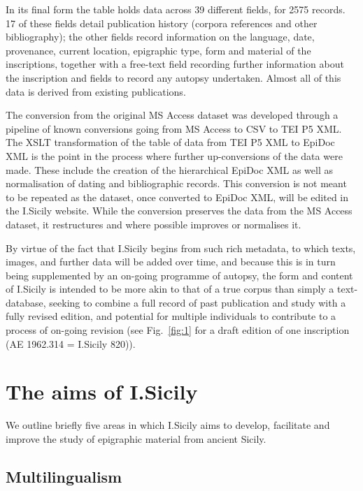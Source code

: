 \documentclass[amsthm,ebook]{saparticle}
\begin{document}
In its final form the table holds data across 39 different fields, for 2575 records. 17 of these fields detail
publication history (corpora references and other bibliography); the other fields record information on the language,
date, provenance, current location, epigraphic type, form and material of the inscriptions, together with a free-text
field recording further information about the inscription and fields to record any autopsy undertaken. Almost all of
this data is derived from existing publications.

The conversion from the original MS Access dataset was developed through a pipeline of known conversions going from MS
Access to CSV to TEI P5 XML. The XSLT transformation of the table of data from TEI P5 XML to EpiDoc XML is the point in
the process where further up-conversions of the data were made. These include the creation of the hierarchical EpiDoc
XML as well as normalisation of dating and bibliographic records. This conversion is not meant to be repeated as the
dataset, once converted to EpiDoc XML, will be edited in the I.Sicily website. While the conversion preserves the data
from the MS Access dataset, it restructures and where possible improves or normalises it.

By virtue of the fact that I.Sicily begins from such rich metadata, to which texts, images, and further data will be
added over time, and because this is in turn being supplemented by an on-going programme of autopsy, the form and
content of I.Sicily is intended to be more akin to that of a true corpus than simply a text-database, seeking to
combine a full record of past publication and study with a fully revised edition, and potential for multiple
individuals to contribute to a process of on-going revision (see Fig.~\ref{fig:1} for a draft edition of one inscription (AE
1962.314 = I.Sicily 820)).




\section{The aims of I.Sicily}
\noindent We outline briefly five areas in which I.Sicily aims to develop, facilitate and improve the study of epigraphic material
from ancient Sicily.




\subsection{Multilingualism}
\end{document}
